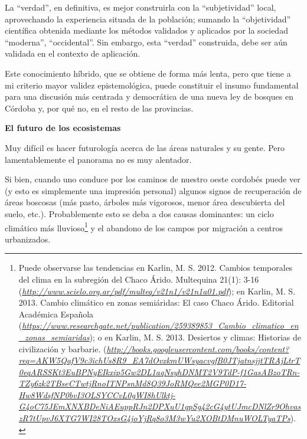 \begin{fullwidth}
La ``verdad'', en definitiva, es mejor construirla con la
``subjetividad'' local, aprovechando la experiencia situada de la
población; sumando la ``objetividad'' científica obtenida mediante los
métodos validados y aplicados por la sociedad ``moderna'',
``occidental''. Sin embargo, esta ``verdad'' construida, debe ser aún
validada en el contexto de aplicación.

Este conocimiento híbrido, que se obtiene de forma más lenta, pero que
tiene a mi criterio mayor validez epistemológica, puede constituir el
insumo fundamental para una discusión más centrada y democrática de una
nueva ley de bosques en Córdoba y, por qué no, en el resto de las
provincias.

\textbf{El futuro de los ecosistemas}

Muy difícil es hacer futurología acerca de las áreas naturales y su
gente. Pero lamentablemente el panorama no es muy alentador.

Si bien, cuando uno conduce por los caminos de nuestro oeste cordobés
puede ver (y esto es simplemente una impresión personal) algunos signos
de recuperación de áreas boscosas (más pasto, árboles más vigorosos,
menor área descubierta del suelo, etc.). Probablemente esto se deba a
dos causas dominantes: un ciclo climático más lluvioso\footnote{Puede
  observarse las tendencias en Karlin, M. S. 2012. Cambios temporales
  del clima en la subregión del Chaco Árido. Multequina 21(1): 3-16
  (\href{http://www.scielo.org.ar/pdf/multeq/v21n1/v21n1a01.pdf}{\emph{http://www.scielo.org.ar/pdf/multeq/v21n1/v21n1a01.pdf}});
  en Karlin, M. S. 2013. Cambio climático en zonas semiáridas: El caso
  Chaco Árido. Editorial Académica Española
  (\href{https://www.researchgate.net/publication/259389853_Cambio_climatico_en_zonas_semiaridas}{\emph{https://www.researchgate.net/publication/259389853\_Cambio\_climatico\_en\_zonas\_semiaridas}});
  o en Karlin, M. S. 2013. Desiertos y climas: Historias de civilización
  y barbarie.
  (\href{http://books.googleusercontent.com/books/content?req=AKW5QafV9c3ichUs8R9_EA7dOvxkmUWsyacvgfB0JTjatnsjjtTRAjLtrT0eqARSSKt3EuBPNyEIkxip5Gw2DL1aqNsyhDNMT2V9TdP-f1GasABzoTRn-TZy6zk2TBseCTwtjRnoITNPsnMd8Q39JoRMQee2MGP0D17-Hw8WdsfNP0bvI3OLSYCCvL0gWI8hUlktj-G4oC75JEmXNXBDeNiAEuppRJn2DPXuU1qpSg42cG4ytUJmcDNlZr9OhvaszR7tUpvJ6XTG7WI28TOxsG4joYjRq8o3M3wYu2XOBtDMnuWOLTyaTPs}{\emph{http://books.googleusercontent.com/books/content?req=AKW5QafV9c3ichUs8R9\_EA7dOvxkmUWsyacvgfB0JTjatnsjjtTRAjLtrT0eqARSSKt3EuBPNyEIkxip5Gw2DL1aqNsyhDNMT2V9TdP-f1GasABzoTRn-TZy6zk2TBseCTwtjRnoITNPsnMd8Q39JoRMQee2MGP0D17-Hw8WdsfNP0bvI3OLSYCCvL0gWI8hUlktj-G4oC75JEmXNXBDeNiAEuppRJn2DPXuU1qpSg42cG4ytUJmcDNlZr9OhvaszR7tUpvJ6XTG7WI28TOxsG4joYjRq8o3M3wYu2XOBtDMnuWOLTyaTPs}}).}
y el abandono de los campos por migración a centros urbanizados.


\end{fullwidth}

